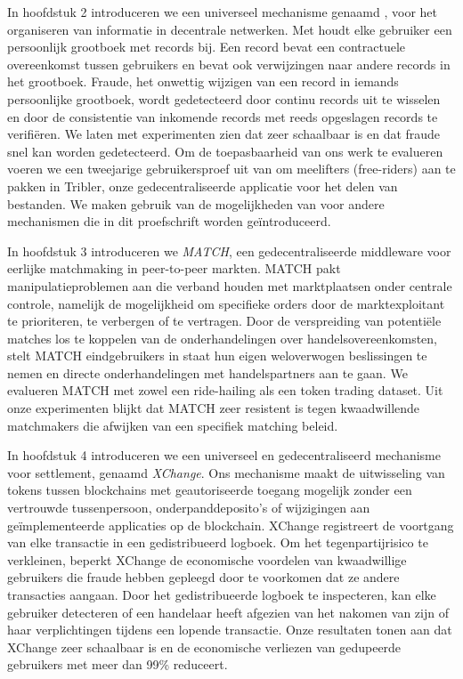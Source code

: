 {In hoofdstuk 2 introduceren we een universeel mechanisme genaamd \emph{\TrustChain{}}, voor het organiseren van informatie in decentrale netwerken.
Met \TrustChain{} houdt elke gebruiker een persoonlijk grootboek met records bij.
Een record bevat een contractuele overeenkomst tussen gebruikers en bevat ook verwijzingen naar andere records in het grootboek.
Fraude, het onwettig wijzigen van een record in iemands persoonlijke grootboek, wordt gedetecteerd door continu records uit te wisselen en door de consistentie van inkomende records met reeds opgeslagen records te verifiëren.
We laten met experimenten zien dat \TrustChain{} zeer schaalbaar is en dat fraude snel kan worden gedetecteerd.
Om de toepasbaarheid van ons werk te evalueren voeren we een tweejarige gebruikersproef uit van \TrustChain{} om meelifters (free-riders) aan te pakken in Tribler, onze gedecentraliseerde applicatie voor het delen van bestanden.
We maken gebruik van de mogelijkheden van \TrustChain{} voor andere mechanismen die in dit proefschrift worden geïntroduceerd.

In hoofdstuk 3 introduceren we \emph{MATCH}, een gedecentraliseerde middleware voor eerlijke matchmaking in peer-to-peer markten.
MATCH pakt manipulatieproblemen aan die verband houden met marktplaatsen onder centrale controle, namelijk de mogelijkheid om specifieke orders door de marktexploitant te prioriteren, te verbergen of te vertragen.
Door de verspreiding van potentiële matches los te koppelen van de onderhandelingen over handelsovereenkomsten, stelt MATCH eindgebruikers in staat hun eigen weloverwogen beslissingen te nemen en directe onderhandelingen met handelspartners aan te gaan.
We evalueren MATCH met zowel een ride-hailing als een token trading dataset.
Uit onze experimenten blijkt dat MATCH zeer resistent is tegen kwaadwillende matchmakers die afwijken van een specifiek matching beleid.

In hoofdstuk 4 introduceren we een universeel en gedecentraliseerd mechanisme voor settlement, genaamd \emph{XChange}.
Ons mechanisme maakt de uitwisseling van tokens tussen blockchains met geautoriseerde toegang mogelijk zonder een vertrouwde tussenpersoon, onderpanddeposito's of wijzigingen aan geïmplementeerde applicaties op de blockchain.
XChange registreert de voortgang van elke transactie in een gedistribueerd logboek.
Om het tegenpartijrisico te verkleinen, beperkt XChange de economische voordelen van kwaadwillige gebruikers die fraude hebben gepleegd door te voorkomen dat ze andere transacties aangaan.
Door het gedistribueerde logboek te inspecteren, kan elke gebruiker detecteren of een handelaar heeft afgezien van het nakomen van zijn of haar verplichtingen tijdens een lopende transactie.
Onze resultaten tonen aan dat XChange zeer schaalbaar is en de economische verliezen van gedupeerde gebruikers met meer dan 99\% reduceert.

}
